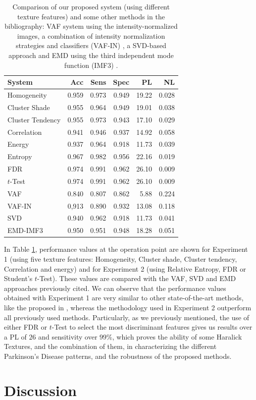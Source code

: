\begin{table}[ht]
	\centering
	\begin{tabular}{l | rrrrr}
		\hline\hline
		\textbf{System}		& \textbf{Acc} 	& \textbf{Sens}	& \textbf{Spec}	& \textbf{PL}	& \textbf{NL}\\ 
		\hline
		Homogeneity & 0.959 & 0.973 & 0.949 & 19.22 & 0.028\\
		Cluster Shade & 0.955 & 0.964 & 0.949 & 19.01 & 0.038\\
		Cluster Tendency & 0.955 & 0.973 & 0.943 & 17.10 & 0.029\\
		Correlation & 0.941 & 0.946 & 0.937 & 14.92 & 0.058\\
		Energy & 0.937 & 0.964 & 0.918 & 11.73 & 0.039\\
		\hline
		Entropy	& 0.967	& 0.982	& 0.956	& 22.16	& 0.019 \\ %
		FDR	& 0.974	& 0.991	& 0.962	& 26.10	& 0.009 \\ %
		$t$-Test	& 0.974	& 0.991	& 0.962	& 26.10	& 0.009 \\ %
		\hline
		VAF & 0.840	& 0.807	& 0.862	& 5.88	& 0.224 \\
		VAF-IN & 0,913 & 0.890 & 0.932 & 13.08 & 0.118\\
		SVD & 0.940 & 0.962 & 0.918 & 11.73 & 0.041\\
		EMD-IMF3 & 0.950 & 0.951 & 0.948 & 18.28 & 0.051\\
		\hline\hline
	\end{tabular}
	\vspace{10pt}
	\caption{Comparison of our proposed system (using different texture features) and some other methods in the bibliography: VAF system using the intensity-normalized images,  a combination of intensity normalization strategies and classifiers (VAF-IN) \cite{Illan2012}, a SVD-based approach \cite{Segovia2012} and EMD using the third independent mode function (IMF3) \cite{Rojas2012}.}
	\label{tab:comparison}
\end{table}

In Table \ref{tab:comparison}, performance values at the operation point are shown for Experiment 1 (using five texture features: Homogeneity, Cluster shade, Cluster tendency, Correlation and energy) and for Experiment 2 (using Relative Entropy, FDR or Student's $t$-Test). These values are compared with the VAF, SVD and EMD approaches previously cited. We can observe that the performance values obtained with Experiment 1 are very similar to other state-of-the-art methods, like the proposed in \cite{Segovia2012,Rojas2012}, whereas the methodology used in Experiment 2 outperform all previously used methods. Particularly, as we previously mentioned, the use of either FDR or $t$-Test to select the most discriminant features gives us results over a PL of $26$ and sensitivity over $99\%$, which proves the ability of some Haralick Textures, and the combination of them, in characterizing the different Parkinson's Disease patterns, and the robustness of the proposed methods. 
\section{Discussion}\label{sec:ch5discuss}